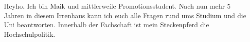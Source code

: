 \begin{multicols*}{2}
{Heyho. Ich bin Maik und mittlerweile Promotionsstudent. Nach nun mehr 5 Jahren in diesem Irrenhaus kann ich euch alle Fragen rund ums Studium und die Uni beantworten. Innerhalb der Fachschaft ist mein Steckenpferd die Hochschulpolitik.}


\end{multicols*}
